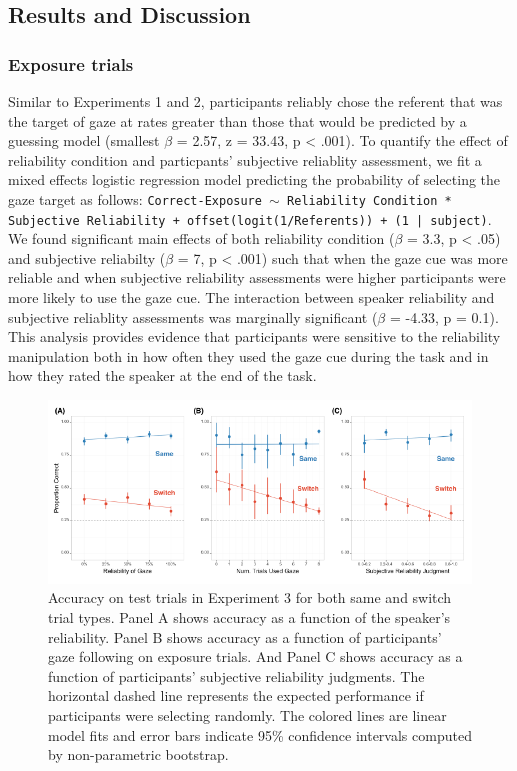 \documentclass[authoryear, review]{elsarticle}
\newenvironment{CodeChunk}{}{}
\begin{document}
\subsection{Results and Discussion}\label{results-and-discussion-2}

\subsubsection{Exposure trials}\label{exposure-trials-2}

Similar to Experiments 1 and 2, participants reliably chose the referent
that was the target of gaze at rates greater than those that would be
predicted by a guessing model (smallest \(\beta\) = 2.57, z = 33.43, p
\textless{} .001). To quantify the effect of reliability condition and
particpants' subjective reliablity assessment, we fit a mixed effects
logistic regression model predicting the probability of selecting the
gaze target as follows:
\texttt{Correct-Exposure $\sim$ Reliability Condition * Subjective Reliability + offset(logit(1/Referents)) + (1 | subject)}.
We found significant main effects of both reliability condition
(\(\beta\) = 3.3, p \textless{} .05) and subjective reliabilty
(\(\beta\) = 7, p \textless{} .001) such that when the gaze cue was more
reliable and when subjective reliability assessments were higher
participants were more likely to use the gaze cue. The interaction
between speaker reliability and subjective reliablity assessments was
marginally significant (\(\beta\) = -4.33, p = 0.1). This analysis
provides evidence that participants were sensitive to the reliability
manipulation both in how often they used the gaze cue during the task
and in how they rated the speaker at the end of the task.

\begin{CodeChunk}
\begin{figure}[tb]
\includegraphics{figs/expt3-plot-1} \caption[Accuracy on test trials in Experiment 3 for both same and switch trial types]{Accuracy on test trials in Experiment 3 for both same and switch trial types. Panel A shows accuracy as a function of the speaker's reliability. Panel B shows accuracy as a function of participants' gaze following on exposure trials. And Panel C shows accuracy as a function of participants' subjective reliability judgments. The horizontal dashed line represents the expected performance if participants were selecting randomly. The colored lines are linear model fits and error bars indicate 95\% confidence intervals computed by non-parametric bootstrap.}\label{fig:expt3-plot}
\end{figure}
\end{CodeChunk}
\end{document}
